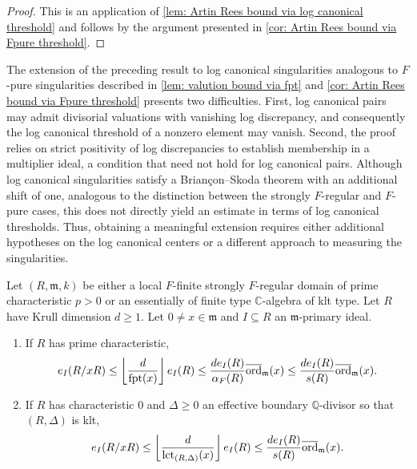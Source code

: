 \documentclass[12pt]{amsart}
\numberwithin{equation}{theorem}
\theoremstyle{plain}
\newcommand{\fm}{\mathfrak{m}}
\newcommand{\QQ}{\mathbb{Q}}
\newcommand{\CC}{\mathbb{C}}
\DeclareMathOperator{\lct}{lct}
\DeclareMathOperator{\FPT}{fpt}
\begin{document}
\begin{proof}
    This is an application of \cref{lem: Artin Rees bound via log canonical threshold} and follows by the argument presented in \cref{cor: Artin Rees bound via Fpure threshold}.
\end{proof}

The extension of the preceding result to log canonical singularities analogous to $F$-pure singularities described in \cref{lem: valution bound via fpt} and \cref{cor: Artin Rees bound via Fpure threshold} presents two difficulties. First, log canonical pairs may admit divisorial valuations with vanishing log discrepancy, and consequently the log canonical threshold of a nonzero element may vanish. Second, the proof relies on strict positivity of log discrepancies to establish membership in a multiplier ideal, a condition that need not hold for log canonical pairs. Although log canonical singularities satisfy a Brian\c{c}on–Skoda theorem with an additional shift of one, analogous to the distinction between the strongly $F$-regular and $F$-pure cases, this does not directly yield an estimate in terms of log canonical thresholds. Thus, obtaining a meaningful extension requires either additional hypotheses on the log canonical centers or a different approach to measuring the singularities.



\begin{theorem}
    \label{thm: Uniform Izumi-Rees for SFR}
    Let $(R,\fm,k)$ be either a local $F$-finite strongly $F$-regular domain of prime characteristic $p>0$ or an essentially of finite type $\CC$-algebra of klt type. Let $R$ have Krull dimension $d\geq 1$. Let $0\not=x\in \fm$ and $I\subseteq R$ an $\fm$-primary ideal.
    \begin{enumerate}
        \item If $R$ has prime characteristic,
        \[
        e_I(R/xR)\leq \left\lfloor \frac{d}{\FPT(x)}\right\rfloor e_I(R)\leq \frac{de_I(R)}{\alpha_F(R)}\overline{\ord}_{\fm}(x) \leq \frac{de_I(R)}{s(R)}\overline{\ord}_{\fm}(x).
        \]
        \item If $R$ has characteristic $0$ and $\Delta\geq 0$ an effective boundary $\QQ$-divisor so that $(R,\Delta)$ is klt,
        \[
        e_I(R/xR)\leq \left\lfloor \frac{d}{\lct_{(R,\Delta)}(x)}\right\rfloor e_I(R)\leq  \frac{de_I(R)}{s(R)}\overline{\ord}_{\fm}(x).
        \]
    \end{enumerate}
    
\end{theorem}
\end{document}
